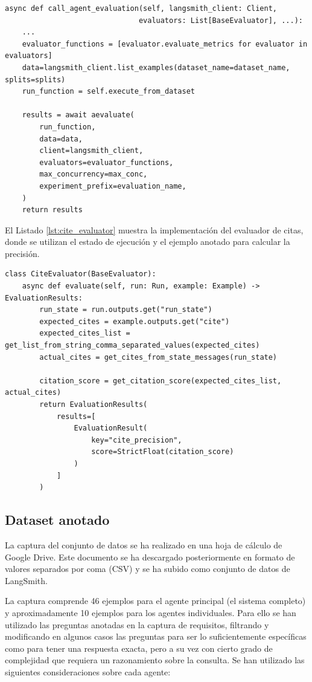 \begin{lstlisting}[caption={Llamada a evaluación de agentes},label={lst:call_evaluation}]
async def call_agent_evaluation(self, langsmith_client: Client, 
                               evaluators: List[BaseEvaluator], ...):
    ...
    evaluator_functions = [evaluator.evaluate_metrics for evaluator in evaluators]
    data=langsmith_client.list_examples(dataset_name=dataset_name, splits=splits)
    run_function = self.execute_from_dataset

    results = await aevaluate(
        run_function,
        data=data,
        client=langsmith_client,
        evaluators=evaluator_functions,
        max_concurrency=max_conc,
        experiment_prefix=evaluation_name,
    )
    return results
\end{lstlisting}

El Listado \ref{lst:cite_evaluator} muestra la implementación del evaluador de citas, donde se utilizan el estado de ejecución y el ejemplo anotado para calcular la precisión.

\begin{lstlisting}[caption={Evaluador de citas},label={lst:cite_evaluator}]
class CiteEvaluator(BaseEvaluator):
    async def evaluate(self, run: Run, example: Example) -> EvaluationResults:
        run_state = run.outputs.get("run_state")
        expected_cites = example.outputs.get("cite")
        expected_cites_list = get_list_from_string_comma_separated_values(expected_cites)
        actual_cites = get_cites_from_state_messages(run_state)

        citation_score = get_citation_score(expected_cites_list, actual_cites)
        return EvaluationResults(
            results=[
                EvaluationResult(
                    key="cite_precision",
                    score=StrictFloat(citation_score)
                )
            ]
        )
\end{lstlisting}


\subsection{Dataset anotado}
\label{sec:dataset}
La captura del conjunto de datos se ha realizado en una hoja de cálculo de Google Drive. Este documento se ha descargado posteriormente en formato de valores separados por coma (CSV) y se ha subido como conjunto de datos de LangSmith.

La captura comprende 46 ejemplos para el agente principal (el sistema completo) y aproximadamente 10 ejemplos para los agentes individuales. Para ello se han utilizado las preguntas anotadas en la captura de requisitos, filtrando y modificando en algunos casos las preguntas para ser lo suficientemente específicas como para tener una respuesta exacta, pero a su vez con cierto grado de complejidad que requiera un razonamiento sobre la consulta. Se han utilizado las siguientes consideraciones sobre cada agente:

